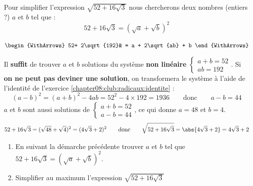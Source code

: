 \documentclass[main.tex]{subfiles}
\begin{document}
\begin{eBox} Pour simplifier l'expression $\sqrt{52+16\sqrt{3}}$  nous chercherons deux  nombres (entiers ?) $a$ et $b$ tel que :
\setlength{\abovedisplayskip}{3pt}
\setlength{\belowdisplayskip}{3pt} 	
$$52+16\sqrt{3}=(\sqrt{a}+\sqrt{b})^2$$
\end{eBox}
\noindent \hfill\parbox{1\linewidth}{\centering
	$\begin{WithArrows}
	52+ 2\sqrt{192}& = a + 2\sqrt{ab} + b 
\end{WithArrows}$ 
}
Il \textbf{suffit} de trouver $a$ et $b$ solutions du système \textbf{non linéaire} $ \begin{cases} a+b = 52 \\ ab=192 \end{cases}  $. Si \textbf{on ne peut pas deviner une solution}, on transformera le système à l'aide de l'identité de l'exercice \ref{chapter08:club:radicaux:identite} : 
\setlength{\abovedisplayskip}{3pt}
\setlength{\belowdisplayskip}{3pt}  
\[
(a-b)^2 =(a+b)^2-4ab = 52^2-4\times 192 = 1936  \qquad \text{donc} \qquad 	a-b   = 44
 \] 
  $a$ et $b$ sont aussi solutions de $\begin{cases} a+b = 52 \\ a-b=44 \end{cases}$, ce qui donne  $a=48$ et $b=4$.
\setlength{\abovedisplayskip}{3pt}
\setlength{\belowdisplayskip}{3pt}  
\[ 
52+16\sqrt{3}=(\sqrt{48}+\sqrt{4})^2=(4\sqrt{3}+2)^2 \qquad \text{donc} \qquad  \sqrt{52+16\sqrt{3}} = \abs{4\sqrt{3}+2} = 4\sqrt{3}+2 
\] 
\begin{exercise} \hfill 
	\begin{enumerate}[label={\arabic*)},leftmargin=*] 
	\item En suivant la démarche précédente trouver $a$ et $b$
	tel que $52+16\sqrt{3}=(\sqrt{a}+\sqrt{b})^2$.
	\item Simplifier au maximum l'expression  $\sqrt{52+16\sqrt{3}}$
\end{enumerate} 
\end{exercise}	 
\end{document}

